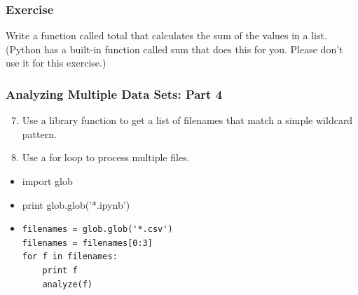 \documentclass[xcolor=dvipsnames]{beamer}
\begin{document}
\begin{frame}
\frametitle{Exercise}
Write a function called total that calculates the sum of the values in a list. (Python has a built-in function called sum that does this for you. Please don't use it for this exercise.)
\end{frame}

\begin{frame}[fragile]
\frametitle{Analyzing Multiple Data Sets: Part 4}
\begin{enumerate}
\setcounter{enumi}{6}
\item     Use a library function to get a list of filenames that match a simple wildcard pattern.
\item    Use a for loop to process multiple files.
\end{enumerate}
\begin{itemize}
\item import glob
\item print glob.glob('*.ipynb')
\item
\begin{verbatim}
filenames = glob.glob('*.csv')
filenames = filenames[0:3]
for f in filenames:
    print f
    analyze(f)
\end{verbatim}
\end{itemize}
\end{frame}
\end{document}
